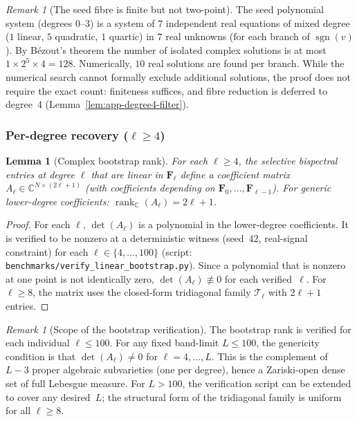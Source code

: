 \documentclass{article}
\newtheorem{lemma}[theorem]{Lemma}
\theoremstyle{definition}
\theoremstyle{remark}
\newtheorem{remark}[theorem]{Remark}
\DeclareMathOperator{\sgn}{sgn}
\newcommand{\C}{\mathbb{C}}
\theoremstyle{definition}
\begin{document}
\begin{remark}[The seed fibre is finite but not two-point]
\label{rem:app-seed-fibre-size}
The seed polynomial system (degrees $0$--$3$) is a system of
$7$ independent real equations of mixed degree ($1$ linear, $5$ quadratic,
$1$ quartic) in $7$ real unknowns (for each branch of $\sgn(v)$).
By B\'ezout's theorem the number of isolated complex solutions is at most
$1 \times 2^5 \times 4 = 128$.
Numerically, $10$ real solutions are found per branch.
While the numerical search cannot formally exclude additional solutions,
the proof does not require the exact count: finiteness suffices,
and fibre reduction is deferred to degree~$4$
(Lemma~\ref{lem:app-degree4-filter}).
\end{remark}

\subsubsection{Per-degree recovery ($\ell \ge 4$)}

\begin{lemma}[Complex bootstrap rank]\label{lem:app-bootstrap-rank}
For each $\ell \ge 4$, the selective bispectral entries at degree $\ell$
that are linear in $\mathbf{F}_\ell$ define a coefficient matrix
$A_\ell \in \C^{N \times (2\ell+1)}$ (with coefficients depending on
$\mathbf{F}_0, \ldots, \mathbf{F}_{\ell-1}$).
For generic lower-degree coefficients:
$\operatorname{rank}_\C(A_\ell) = 2\ell+1$.
\end{lemma}
\begin{proof}
For each $\ell$, $\det(A_\ell)$ is a polynomial in the lower-degree
coefficients.  It is verified to be nonzero at a deterministic
witness (seed~42, real-signal constraint) for each
$\ell \in \{4, \ldots, 100\}$
(script: \texttt{benchmarks/verify\_linear\_bootstrap.py}).
Since a polynomial that is nonzero at one point is not identically zero,
$\det(A_\ell) \not\equiv 0$ for each verified~$\ell$.
For $\ell \ge 8$, the matrix uses the closed-form tridiagonal family
$\mathcal{T}_\ell$ with $2\ell+1$ entries.
\end{proof}

\begin{remark}[Scope of the bootstrap verification]\label{rem:app-bootstrap-scope}
The bootstrap rank is verified for each individual $\ell \le 100$.
For any fixed band-limit $L \le 100$, the genericity condition is that
$\det(A_\ell) \ne 0$ for $\ell = 4, \ldots, L$.
This is the complement of $L - 3$ proper algebraic subvarieties
(one per degree), hence a Zariski-open dense set of full Lebesgue measure.
For $L > 100$, the verification script can be extended to cover any
desired~$L$; the structural form of the tridiagonal family is uniform
for all $\ell \ge 8$.
\end{remark}
\end{document}
